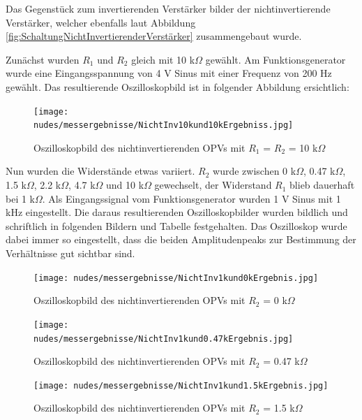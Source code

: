\documentclass[12pt,a4paper,twoside]{article}
\begin{document}
Das Gegenstück zum invertierenden Verstärker bilder der nichtinvertierende Verstärker, welcher ebenfalls laut Abbildung \ref{fig:SchaltungNichtInvertierenderVerstärker} zusammengebaut wurde. \newline

\noindent
Zunächst wurden $R_{1}$ und $R_{2}$ gleich mit 10 k$\Omega$ gewählt. Am Funktionsgenerator wurde eine Eingangsspannung von 4 V Sinus mit einer Frequenz von 200 Hz gewählt. Das resultierende Oszilloskopbild ist in folgender Abbildung ersichtlich:

\begin{figure}[H]
    \centering
    \texttt{[image: nudes/messergebnisse/NichtInv10kund10kErgebniss.jpg]}
    \caption{Oszilloskopbild des nichtinvertierenden OPVs mit $R_{1}$ = $R_{2}$ = 10 k$\Omega$}
    \label{fig:Nichtinvertierender10k10kOszibild}
\end{figure}

\noindent
Nun wurden die Widerstände etwas variiert. $R_{2}$ wurde zwischen 0 k$\Omega$, 0.47 k$\Omega$, 1.5 k$\Omega$, 2.2 k$\Omega$, 4.7 k$\Omega$ und 10 k$\Omega$ gewechselt, der Widerstand $R_{1}$ blieb dauerhaft bei 1 k$\Omega$. Als Eingangssignal vom Funktionsgenerator wurden 1 V Sinus mit 1 kHz eingestellt.
Die daraus resultierenden Oszilloskopbilder wurden bildlich und schriftlich in folgenden Bildern und Tabelle festgehalten. Das Oszilloskop wurde dabei immer so eingestellt, dass die beiden Amplitudenpeaks zur Bestimmung der Verhältnisse gut sichtbar sind.

\begin{figure}[H]
    \centering
    \texttt{[image: nudes/messergebnisse/NichtInv1kund0kErgebnis.jpg]}
    \caption{Oszilloskopbild des nichtinvertierenden OPVs mit $R_{2}$ = 0 k$\Omega$}
    \label{fig:Nichtinvertierender1k0kOszibild}
\end{figure}

\begin{figure}[H]
    \centering
    \texttt{[image: nudes/messergebnisse/NichtInv1kund0.47kErgebnis.jpg]}
    \caption{Oszilloskopbild des nichtinvertierenden OPVs mit $R_{2}$ = 0.47 k$\Omega$}
    \label{fig:Nichtinvertierender1k0.47kOszibild}
\end{figure}

\begin{figure}[H]
    \centering
    \texttt{[image: nudes/messergebnisse/NichtInv1kund1.5kErgebnis.jpg]}
    \caption{Oszilloskopbild des nichtinvertierenden OPVs mit $R_{2}$ = 1.5 k$\Omega$}
    \label{fig:Nichtinvertierender1k1.5kOszibild}
\end{figure}
\end{document}
